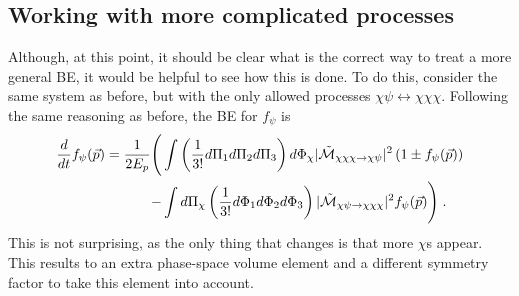 \documentclass[11pt,a4paper]{article}
\begin{document}
\subsection*{Working with more complicated processes}
%
Although, at this point, it should be clear what is the correct way to treat a more general BE, it would be helpful to see how this is done. To do this, consider the same system as before, but with the only allowed processes $\chi \psi \leftrightarrow \chi \chi \chi$. Following the same reasoning as before, the BE for $f_\psi$ is 
%
\begin{eqnarray}
\dfrac{d}{dt} f_{\psi }(\vec{p}) = \dfrac{1}{2E_p} \Bigg( &
	\displaystyle \int  \left( \dfrac{1}{3!} 
		d\Pi_{1} d\Pi_{2}d\Pi_{3}  \right) d\Phi_{\chi}  |\tilde{ \mathcal{M} }_{\chi \chi\chi  \to \chi \psi}|^2 \left( 1\pm f_{\psi }(\vec{p}) \right) \nonumber \\
	-&\displaystyle \int d\Pi_{\chi} \left( \dfrac{1}{3!} d\Phi_{1} d\Phi_{2}d\Phi_{3} \right)   |\tilde{ \mathcal{M} }_{\chi \psi \to \chi \chi\chi }|^2 f_{\psi }(\vec{p} )
 \Bigg)\;.
\label{eq:BE_23-psi}
\end{eqnarray}
%
This is not surprising, as the only thing that changes is that more $\chi$s appear. This results to an extra phase-space volume element and a different symmetry factor to take this element into account. 
\end{document}
